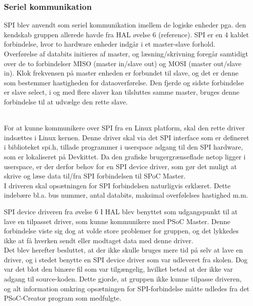 \subsubsection{Seriel kommunikation}
SPI blev anvendt som seriel kommunikation imellem de logiske enheder pga. den kendskab gruppen allerede havde fra HAL øvelse 6 (reference). SPI er en 4 kablet
forbindelse, hvor to hardware enheder indgår i et master-slave forhold. Overførelse af databits initieres af master, og læsning/skrivning foregår samtidigt 
over de to forbindelser MISO (master in/slave out) og MOSI (master out/slave in). Klok frekvensen på master enheden er forbundet til slave, og det er denne 
som bestemmer hastigheden for dataoverførelse. Den fjerde og sidste forbindelse er slave select, i og med flere slaver kan tilsluttes samme master, bruges 
denne forbindelse til at udvælge den rette slave.   

\\ 
For at kunne kommunikere over SPI fra en Linux platform, skal den rette driver indsættes i Linux kernen. Denne driver skal via det SPI interface som
er defineret i biblioteket spi.h, tillade programmer i userspace adgang til den SPI hardware, som er lokaliseret på Devkittet. Da den grafiske brugergrænseflade
netop ligger i userspace, er der derfor behov for en SPI device driver, som gør det muligt at skrive og læse data til/fra SPI forbindelsen til SPoC Master.\\

I driveren skal opsætningen for SPI forbindelsen naturligvis erklæret. Dette indebære bl.a. bus nummer, antal databits, maksimal overfølelses hastighed m.m.  
 
SPI device driveren fra øvelse 6 I HAL blev benyttet som udgangspunkt til at lave en tilpasset driver, som kunne kommunikere med PSoC Master. 
Denne forbindelse viste sig dog at volde store problemer for gruppen, og det lykkedes ikke at få hverken sendt eller modtaget data med denne driver.\\

Det blev herefter besluttet, at der ikke skulle bruges mere tid på selv at lave en driver, og i stedet benytte en SPI device driver som var udleveret fra skolen.
Dog var det blot den binære fil som var tilgængelig, hvilket betød at der ikke var adgang til source-koden. Dette gjorde, at gruppen ikke kunne tilpasse driveren,
og alt information omkring opsætningen for SPI-forbindelse måtte udledes fra det PSoC-Creator program som medfulgte. 


